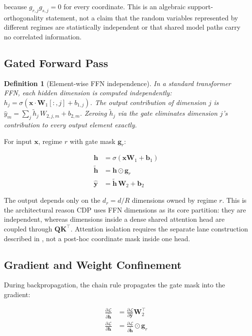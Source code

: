 \documentclass[11pt,a4paper]{article}
\newtheorem{definition}{Definition}
\newcommand{\bx}{\mathbf{x}}
\newcommand{\bh}{\mathbf{h}}
\newcommand{\bW}{\mathbf{W}}
\newcommand{\bQ}{\mathbf{Q}}
\newcommand{\bK}{\mathbf{K}}
\newcommand{\bg}{\mathbf{g}}
\newcommand{\cL}{\mathcal{L}}
\begin{document}
because $g_{r,j}g_{s,j}=0$ for every coordinate.  This is an
algebraic support-orthogonality statement, not a claim that the
random variables represented by different regimes are statistically
independent or that shared model paths carry no correlated
information.

\subsection{Gated Forward Pass}
\label{sec:gated-forward}

\begin{definition}[Element-wise FFN independence]
\label{def:ffn-independence}
In a standard transformer FFN, each hidden dimension is computed
independently: $h_j = \sigma(\bx \cdot \bW_1[:,j] + b_{1,j})$.
The output contribution of dimension $j$ is
$\hat{y}_m = \sum_j \tilde{h}_j \, W_{2,j,m} + b_{2,m}$.
Zeroing $\tilde{h}_j$ via the gate eliminates dimension $j$'s
contribution to every output element exactly.
\end{definition}

For input $\bx$, regime $r$ with gate mask $\bg_r$:

\begin{align}
    \bh &= \sigma(\bx \bW_1 + \mathbf{b}_1)
    \label{eq:ffn-hidden} \\
    \tilde{\bh} &= \bh \odot \bg_r
    \label{eq:gate-apply} \\
    \hat{\mathbf{y}} &= \tilde{\bh} \, \bW_2 + \mathbf{b}_2
    \label{eq:ffn-output}
\end{align}

The output depends only on the $d_r=d/R$ dimensions
owned by regime $r$.  This is the architectural reason CDP
uses FFN dimensions as its core partition: they are independent,
whereas dimensions inside a dense shared attention head are coupled
through $\bQ\bK^\top$.  Attention isolation requires the separate
lane construction described in , not a
post-hoc coordinate mask inside one head.

\subsection{Gradient and Weight Confinement}
\label{sec:gradient-isolation}

During backpropagation, the chain rule propagates the gate mask
into the gradient:

\begin{align}
    \frac{\partial \cL}{\partial \tilde{\bh}} &=
    \frac{\partial \cL}{\partial \hat{\mathbf{y}}} \bW_2^\top \\
    \frac{\partial \cL}{\partial \bh} &=
    \frac{\partial \cL}{\partial \tilde{\bh}} \odot \bg_r
    \label{eq:grad-isolation}
\end{align}
\end{document}
